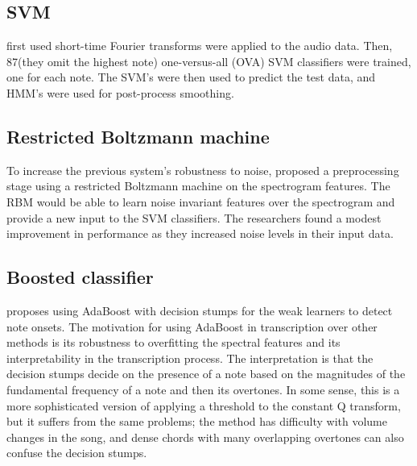 \documentclass[5p]{elsarticle}
\begin{document}
\subsection{SVM}



\citet{poliner2006discriminative} first used short-time Fourier transforms were applied to the audio data.  Then,  87(they omit the highest note) one-versus-all (OVA) SVM classifiers were trained, one for each note.  The SVM's were then used to predict the test data, and HMM's were used for post-process smoothing.

\subsection{Restricted Boltzmann machine}

To increase the previous system's robustness to noise, \citet{nam2011classification} proposed a preprocessing stage using a restricted Boltzmann machine on the spectrogram features. The RBM would be able to learn noise invariant features over the spectrogram and provide a new input to the SVM classifiers. The researchers found a modest improvement in performance as they increased noise levels in their input data.

\subsection{Boosted classifier}

\citet{boogaart2009note} proposes using AdaBoost with decision stumps for the weak learners to detect note onsets. The motivation for using AdaBoost in transcription over other methods is its robustness to overfitting the spectral features and its interpretability in the transcription process. The interpretation is that the decision stumps decide on the presence of a note based on the magnitudes of the fundamental frequency of a note and then its overtones. In some sense, this is a more sophisticated version of applying a threshold to the constant Q transform, but it suffers from the same problems; the method has difficulty with volume changes in the song, and dense chords with many overlapping overtones can also confuse the decision stumps.

\end{document}
